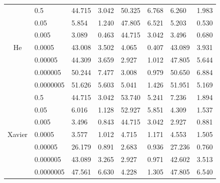\begin{table}[H]
\begin{tabular}{cl|lrlllr|}
\multicolumn{1}{|c|}{\multirow{7}{*}{He}}     & 0.5       & 44.715 & \multicolumn{1}{l|}{3.042} & 50.325 & \multicolumn{1}{l|}{6.768} & 6.260          & 1.983        \\
\multicolumn{1}{|c|}{}                        & 0.05      & 5.854  & \multicolumn{1}{l|}{1.240} & 47.805 & \multicolumn{1}{l|}{6.521} & 5.203          & 0.530        \\
\multicolumn{1}{|c|}{}                        & 0.005     & 3.089  & \multicolumn{1}{r|}{0.463} & 44.715 & \multicolumn{1}{l|}{3.042} & 3.496          & 0.680        \\
\multicolumn{1}{|c|}{}                        & 0.0005    & 43.008 & \multicolumn{1}{l|}{3.502} & 4.065  & \multicolumn{1}{r|}{0.407} & 43.089         & 3.931        \\
\multicolumn{1}{|c|}{}                        & 0.00005   & 44.309 & \multicolumn{1}{l|}{3.659} & 2.927  & \multicolumn{1}{r|}{1.012} & 47.805         & 5.644        \\
\multicolumn{1}{|c|}{}                        & 0.000005  & 50.244 & \multicolumn{1}{l|}{7.477} & 3.008  & \multicolumn{1}{r|}{0.979} & 50.650         & 6.884        \\
\multicolumn{1}{|c|}{}                        & 0.0000005 & 51.626 & \multicolumn{1}{l|}{5.603} & 5.041  & \multicolumn{1}{r|}{1.426} & 51.951         & 5.169        \\ \hline
\multicolumn{1}{|c|}{\multirow{7}{*}{Xavier}} & 0.5       & 44.715 & \multicolumn{1}{r|}{3.042} & 53.740 & \multicolumn{1}{l|}{5.241} & 7.236          & 1.894        \\
\multicolumn{1}{|c|}{}                        & 0.05      & 6.016  & \multicolumn{1}{r|}{1.128} & 52.927 & \multicolumn{1}{l|}{5.851} & 4.309          & 1.537        \\
\multicolumn{1}{|c|}{}                        & 0.005     & 3.496  & \multicolumn{1}{r|}{0.843} & 44.715 & \multicolumn{1}{l|}{3.042} & 2.927          & 0.881        \\
\multicolumn{1}{|c|}{}                        & 0.0005    & 3.577  & \multicolumn{1}{r|}{1.012} & 4.715  & \multicolumn{1}{r|}{1.171} & 4.553          & 1.505        \\
\multicolumn{1}{|c|}{}                        & 0.00005   & 26.179 & \multicolumn{1}{r|}{0.891} & 2.683  & \multicolumn{1}{r|}{0.936} & 27.236         & 0.760        \\
\multicolumn{1}{|c|}{}                        & 0.000005  & 43.089 & \multicolumn{1}{r|}{3.265} & 2.927  & \multicolumn{1}{r|}{0.971} & 42.602         & 3.513        \\
\multicolumn{1}{|c|}{}                        & 0.0000005 & 47.561 & \multicolumn{1}{r|}{6.630} & 4.228  & \multicolumn{1}{l|}{1.305} & 47.805         & 6.540        \\ \hline
\end{tabular}
\end{table}


